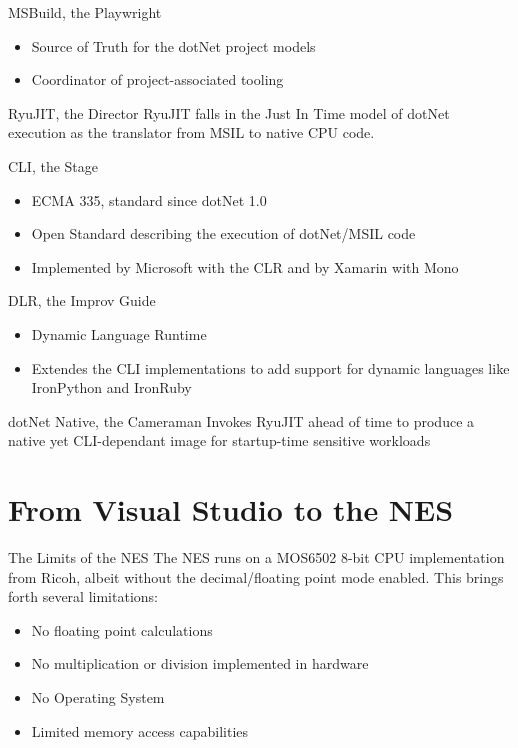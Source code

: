 \documentclass[10pt]{beamer}
\begin{document}
\begin{frame}{MSBuild, the Playwright}
    \begin{itemize}
        \item Source of Truth for the dotNet project models
        \item Coordinator of project-associated tooling
    \end{itemize}
\end{frame}

\begin{frame}{RyuJIT, the Director}
    RyuJIT falls in the Just In Time model of dotNet execution as the translator from MSIL to native CPU code.
\end{frame}

\begin{frame}{CLI, the Stage}
    \begin{itemize}
        \item ECMA 335, standard since dotNet 1.0
        \item Open Standard describing the execution of dotNet/MSIL code
        \item Implemented by Microsoft with the CLR and by Xamarin with Mono
    \end{itemize}
\end{frame}

\begin{frame}{DLR, the Improv Guide}
    \begin{itemize}
        \item Dynamic Language Runtime
        \item Extendes the CLI implementations to add support for dynamic languages like IronPython and IronRuby
    \end{itemize}
\end{frame}

\begin{frame}{dotNet Native, the Cameraman}
    Invokes RyuJIT ahead of time to produce a native yet CLI-dependant image for startup-time sensitive workloads
\end{frame}

\section{From Visual Studio to the NES}
\begin{frame}{The Limits of the NES}
The NES runs on a MOS6502 8-bit CPU implementation from Ricoh, albeit without the decimal/floating point mode enabled. This brings forth several limitations:
\begin{itemize}
    \item No floating point calculations
    \item No multiplication or division implemented in hardware
    \item No Operating System
    \item Limited memory access capabilities
\end{itemize}
\end{frame}
\end{document}
